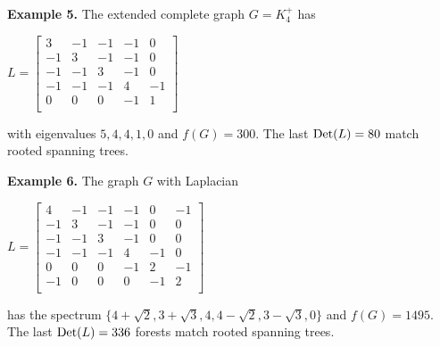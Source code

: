 \documentclass[12pt]{amsart}
\theoremstyle{definition}
\begin{document}
\begin{figure}[H]
\end{figure}

{\bf Example 5.}
The extended complete graph $G=K_4^+$ has 
\begin{tiny}$L= \left[
                 \begin{array}{ccccc}
                  3 & -1 & -1 & -1 & 0 \\
                  -1 & 3 & -1 & -1 & 0 \\
                  -1 & -1 & 3 & -1 & 0 \\
                  -1 & -1 & -1 & 4 & -1 \\
                  0 & 0 & 0 & -1 & 1 \\
                 \end{array}
                 \right]$ \end{tiny} with eigenvalues $5,4,4,1,0$
and $f(G) =300$. The last ${\rm{Det}}(L)=80$ match rooted spanning trees.

\begin{figure}[H]
\end{figure}

{\bf Example 6.}
The graph $G$ with Laplacian
\begin{tiny}$L= \left[
 \begin{array}{cccccc}
                  4 & -1 & -1 & -1 & 0 & -1 \\
                  -1 & 3 & -1 & -1 & 0 & 0 \\
                  -1 & -1 & 3 & -1 & 0 & 0 \\
                  -1 & -1 & -1 & 4 & -1 & 0 \\
                  0 & 0 & 0 & -1 & 2 & -1 \\
                  -1 & 0 & 0 & 0 & -1 & 2 \\
                 \end{array}
                 \right]$ \end{tiny} has the spectrum $\{4+\sqrt{2},3+\sqrt{3},4,4-\sqrt{2},3-\sqrt{3},0 \}$
and $f(G) =1495$. The last ${\rm{Det}}(L)=336$ forests match rooted spanning trees.

\begin{figure}[H]
\end{figure}

\pagebreak 
\end{document}
